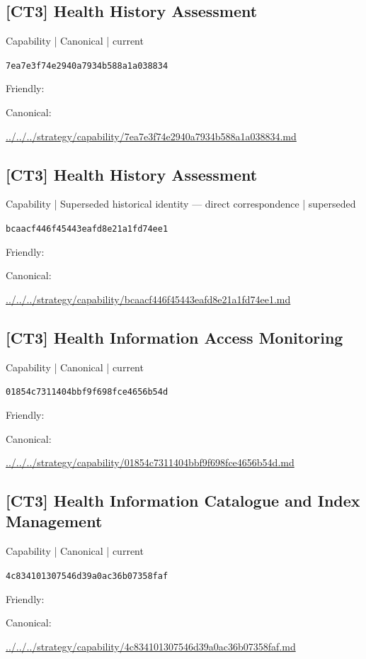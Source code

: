 \documentclass[10pt,a4paper]{article}
\begin{document}
\subsection*{[CT3] Health History Assessment}
{\small Capability | Canonical | current}\par
\texttt{7ea7e3f74e2940a7934b588a1a038834}\par
Friendly: \par
Canonical: \par
{\footnotesize\url{../../../strategy/capability/7ea7e3f74e2940a7934b588a1a038834.md}}\par
\subsection*{[CT3] Health History Assessment}
{\small Capability | Superseded historical identity — direct correspondence | superseded}\par
\texttt{bcaacf446f45443eafd8e21a1fd74ee1}\par
Friendly: \par
Canonical: \par
{\footnotesize\url{../../../strategy/capability/bcaacf446f45443eafd8e21a1fd74ee1.md}}\par
\subsection*{[CT3] Health Information Access Monitoring}
{\small Capability | Canonical | current}\par
\texttt{01854c7311404bbf9f698fce4656b54d}\par
Friendly: \par
Canonical: \par
{\footnotesize\url{../../../strategy/capability/01854c7311404bbf9f698fce4656b54d.md}}\par
\subsection*{[CT3] Health Information Catalogue and Index Management}
{\small Capability | Canonical | current}\par
\texttt{4c834101307546d39a0ac36b07358faf}\par
Friendly: \par
Canonical: \par
{\footnotesize\url{../../../strategy/capability/4c834101307546d39a0ac36b07358faf.md}}\par
\end{document}
